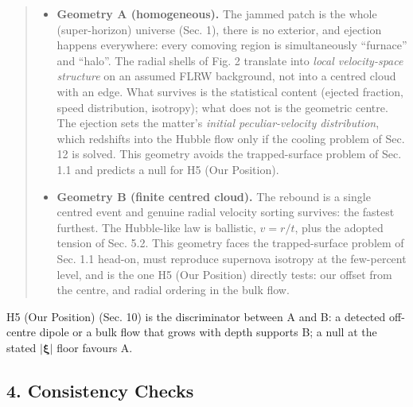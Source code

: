 \documentclass[
]{article}
\providecommand{\tightlist}{%
  \setlength{\itemsep}{0pt}\setlength{\parskip}{0pt}}
\begin{document}
\begin{quote}
\begin{itemize}
\tightlist
\item
  \textbf{Geometry A (homogeneous).} The jammed patch is the whole
  (super-horizon) universe (Sec. 1), there is no exterior, and ejection
  happens everywhere: every comoving region is simultaneously
  ``furnace'' and ``halo''. The radial shells of Fig. 2 translate into
  \emph{local velocity-space structure} on an assumed FLRW background,
  not into a centred cloud with an edge. What survives is the
  statistical content (ejected fraction, speed distribution, isotropy);
  what does not is the geometric centre. The ejection sets the matter's
  \emph{initial peculiar-velocity distribution}, which redshifts into
  the Hubble flow only if the cooling problem of Sec. 12 is solved. This
  geometry avoids the trapped-surface problem of Sec. 1.1 and predicts a
  null for H5 (Our Position).
\item
  \textbf{Geometry B (finite centred cloud).} The rebound is a single
  centred event and genuine radial velocity sorting survives: the
  fastest furthest. The Hubble-like law is ballistic, \(v = r/t\), plus
  the adopted tension of Sec. 5.2. This geometry faces the
  trapped-surface problem of Sec. 1.1 head-on, must reproduce supernova
  isotropy at the few-percent level, and is the one H5 (Our Position)
  directly tests: our offset from the centre, and radial ordering in the
  bulk flow.
\end{itemize}
\end{quote}

H5 (Our Position) (Sec. 10) is the discriminator between A and B: a
detected off-centre dipole or a bulk flow that grows with depth supports
B; a null at the stated \(|\boldsymbol{\xi}|\) floor favours A.

\hypertarget{consistency-checks}{%
\subsection{\texorpdfstring{\textbf{4. Consistency
Checks}}{4. Consistency Checks}}\label{consistency-checks}}
\end{document}
